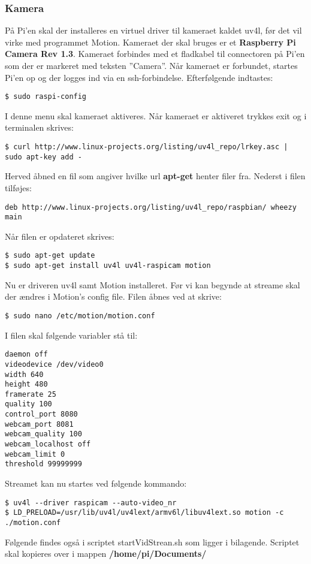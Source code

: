 \subsubsection{Kamera}
På Pi'en skal der installeres en virtuel driver til kameraet kaldet uv4l, før det vil virke med programmet Motion. Kameraet der skal bruges er et \textbf{Raspberry Pi Camera Rev 1.3}. Kameraet forbindes med et fladkabel til connectoren på Pi'en som der er markeret med teksten ''Camera''. Når kameraet er forbundet, startes Pi'en op og der logges ind via en ssh-forbindelse. Efterfølgende indtastes: 
\begin{lstlisting}
$ sudo raspi-config
\end{lstlisting}
I denne menu skal kameraet aktiveres. Når kameraet er aktiveret trykkes exit og i terminalen skrives:
\begin{lstlisting}
$ curl http://www.linux-projects.org/listing/uv4l_repo/lrkey.asc | sudo apt-key add -
\end{lstlisting}
Herved åbned en fil som angiver hvilke url \textbf{apt-get} henter filer fra. Nederst i filen tilføjes:
\begin{lstlisting}
deb http://www.linux-projects.org/listing/uv4l_repo/raspbian/ wheezy main
\end{lstlisting}
Når filen er opdateret skrives:
\begin{lstlisting}
$ sudo apt-get update
$ sudo apt-get install uv4l uv4l-raspicam motion
\end{lstlisting}
Nu er driveren uv4l samt Motion installeret. Før vi kan begynde at streame skal der ændres i Motion's config file.  Filen åbnes ved at skrive:
\begin{lstlisting}
$ sudo nano /etc/motion/motion.conf
\end{lstlisting}
I filen skal følgende variabler stå til:
\begin{lstlisting}
daemon off
videodevice /dev/video0
width 640
height 480
framerate 25
quality 100
control_port 8080
webcam_port 8081
webcam_quality 100
webcam_localhost off
webcam_limit 0
threshold 99999999
\end{lstlisting}
Streamet kan nu startes ved følgende kommando:
\begin{lstlisting}
$ uv4l --driver raspicam --auto-video_nr
$ LD_PRELOAD=/usr/lib/uv4l/uv4lext/armv6l/libuv4lext.so motion -c ./motion.conf
\end{lstlisting}
Følgende findes også i scriptet startVidStrean.sh som ligger i bilagende. Scriptet skal kopieres over i mappen \textbf{/home/pi/Documents/}
